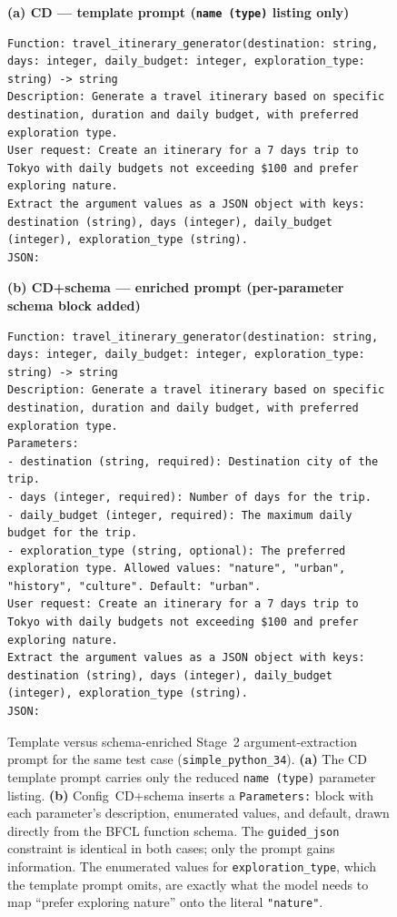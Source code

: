 \begin{figure}[ht]
\textbf{(a) CD --- template prompt (\texttt{name (type)} listing only)}
\begin{lstlisting}[style=promptbox]
Function: travel_itinerary_generator(destination: string, days: integer, daily_budget: integer, exploration_type: string) -> string
Description: Generate a travel itinerary based on specific destination, duration and daily budget, with preferred exploration type.
User request: Create an itinerary for a 7 days trip to Tokyo with daily budgets not exceeding $100 and prefer exploring nature.
Extract the argument values as a JSON object with keys: destination (string), days (integer), daily_budget (integer), exploration_type (string).
JSON:
\end{lstlisting}

\vspace{4pt}
\textbf{(b) CD+schema --- enriched prompt (per-parameter schema block added)}
\begin{lstlisting}[style=promptbox]
Function: travel_itinerary_generator(destination: string, days: integer, daily_budget: integer, exploration_type: string) -> string
Description: Generate a travel itinerary based on specific destination, duration and daily budget, with preferred exploration type.
Parameters:
- destination (string, required): Destination city of the trip.
- days (integer, required): Number of days for the trip.
- daily_budget (integer, required): The maximum daily budget for the trip.
- exploration_type (string, optional): The preferred exploration type. Allowed values: "nature", "urban", "history", "culture". Default: "urban".
User request: Create an itinerary for a 7 days trip to Tokyo with daily budgets not exceeding $100 and prefer exploring nature.
Extract the argument values as a JSON object with keys: destination (string), days (integer), daily_budget (integer), exploration_type (string).
JSON:
\end{lstlisting}
\caption{Template versus schema-enriched Stage~2 argument-extraction prompt
for the same test case (\texttt{simple\_python\_34}). \textbf{(a)} The CD
template prompt carries only the reduced \texttt{name (type)} parameter
listing. \textbf{(b)} Config~CD+schema inserts a \texttt{Parameters:} block
with each parameter's description, enumerated values, and default, drawn
directly from the BFCL function schema. The \texttt{guided\_json} constraint
is identical in both cases; only the prompt gains information. The enumerated
values for \texttt{exploration\_type}, which the template prompt omits, are
exactly what the model needs to map ``prefer exploring nature'' onto the
literal \texttt{"nature"}.}
\label{fig:template-vs-enriched}
\end{figure}

